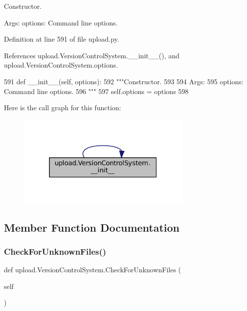 \begin{DoxyVerb}Constructor.

Args:
  options: Command line options.
\end{DoxyVerb}
 

Definition at line 591 of file upload.\+py.



References upload.\+Version\+Control\+System.\+\_\+\+\_\+init\+\_\+\+\_\+(), and upload.\+Version\+Control\+System.\+options.


\begin{DoxyCode}
591   \textcolor{keyword}{def }\_\_init\_\_(self, options):
592     \textcolor{stringliteral}{"""Constructor.}
593 \textcolor{stringliteral}{}
594 \textcolor{stringliteral}{    Args:}
595 \textcolor{stringliteral}{      options: Command line options.}
596 \textcolor{stringliteral}{    """}
597     self.options = options
598 
\end{DoxyCode}
Here is the call graph for this function\+:
\nopagebreak
\begin{figure}[H]
\begin{center}
\leavevmode
\includegraphics[width=244pt]{classupload_1_1VersionControlSystem_ace97e5785a2b40011404ae6fbb956ecf_cgraph}
\end{center}
\end{figure}


\subsection{Member Function Documentation}
\mbox{\label{classupload_1_1VersionControlSystem_ad2923d691a1b1047e9359c5b7c1c103f}} 
\subsubsection{\texorpdfstring{Check\+For\+Unknown\+Files()}{CheckForUnknownFiles()}\hspace{0.1cm}{\footnotesize\ttfamily [1/2]}}
{\footnotesize\ttfamily def upload.\+Version\+Control\+System.\+Check\+For\+Unknown\+Files (\begin{DoxyParamCaption}\item[{}]{self }\end{DoxyParamCaption})}

